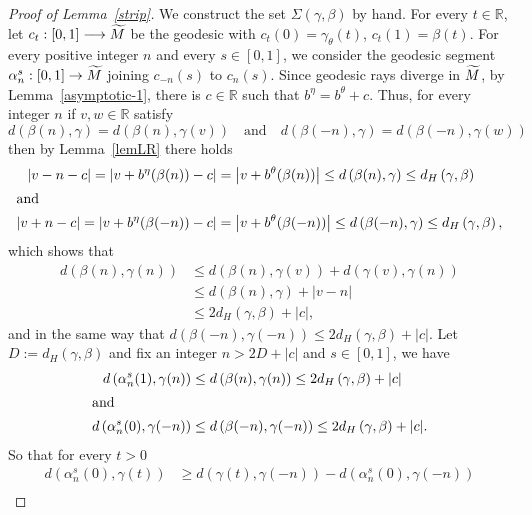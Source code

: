 \documentclass[10pt]{amsart}
\theoremstyle{definition}
\newcommand{\bbR}{\mathbb{R}}
\let\oldtilde\tilde
\renewcommand*{\tilde}[1]{\mathchoice{\widetilde{#1}}{\widetilde{#1}}{\oldtilde{#1}}{\oldtilde{#1}}}
\begin{document}
\begin{proof}[Proof of Lemma~\ref{strip}]
We construct the set $\Sigma(\gamma, \beta)$ by hand. For every $t\in \bbR$, let $c_{t}: [0,1] \longrightarrow \tilde{M}$ be the geodesic with $c_{t}(0)= \gamma_{\theta}(t)$, $c_{t}(1) = \beta(t)$. For every positive integer $n$ and every $s\in [0,1]$, we consider the geodesic segment $\alpha_n^s : [0,1] \rightarrow \tilde{M}$ joining $c_{-n}(s)$ to $c_{n}(s)$. Since geodesic rays diverge in $\tilde{M}$, by Lemma~\ref{asymptotic-1}, there is $c\in \bbR$ such that $b^{\eta}=b^{\theta}+c$. Thus, for every integer $n$ if $v, w \in \bbR$ satisfy
\[
d \left(\beta(n),\gamma\right) = d \left(\beta(n),\gamma(v) \right) \quad \mbox{and} \quad d \left(\beta(-n),\gamma\right) = d \left(\beta(-n),\gamma(w) \right)
\]
then by Lemma~\ref{lemLR} there holds
\begin{align*}
\left| v-n-c\right| = \left|v+b^{\eta}(\beta(n)) -c \right| &= \left|v+b^{\theta}(\beta(n))\right| \leq d \left(\beta(n),\gamma\right) \leq d_{H} \left(\gamma,\beta\right)
\\
\intertext{and}
\left| v+n-c\right| = \left|v+b^{\eta}(\beta(-n)) -c \right| &= \left|v+b^{\theta}(\beta(-n))\right| \leq d \left(\beta(-n),\gamma\right) \leq d_{H} \left(\gamma,\beta\right),
\end{align*}
which shows that
\begin{align*}
d\left(\beta(n),\gamma(n)\right) & \leq d\left(\beta(n),\gamma(v)\right) + d\left(\gamma(v),\gamma(n)\right)\\
& \leq d\left(\beta(n),\gamma\right) + |v-n| \\
& \leq 2 d_{H} \left(\gamma,\beta\right) + |c|,
\end{align*}
and in the same way that $d\left(\beta(-n),\gamma(-n)\right) \leq 2 d_{H} \left(\gamma,\beta\right) + |c|$. Let $D:=d_H(\gamma,\beta)$ and fix an integer $n>2D+|c|$ and $s\in [0,1]$, we have
\begin{align*}
d\left(\alpha_n^s(1),\gamma(n)\right) &\leq d\left(\beta(n),\gamma(n)\right) \leq 2 d_{H} \left(\gamma,\beta\right) + |c|
\\
\intertext{and}
d\left(\alpha_n^s(0),\gamma(-n)\right) &\leq d\left(\beta(-n),\gamma(-n)\right) \leq 2 d_{H} \left(\gamma,\beta\right) + |c|.
\end{align*}
So that for every $t>0$
\begin{align*}
d\left(\alpha_n^s(0),\gamma(t)\right) & \geq d\left(\gamma(t),\gamma(-n)\right)-d\left(\alpha_n^s(0),\gamma(-n)\right) \\

\end{align*}
\end{proof}
\end{document}
